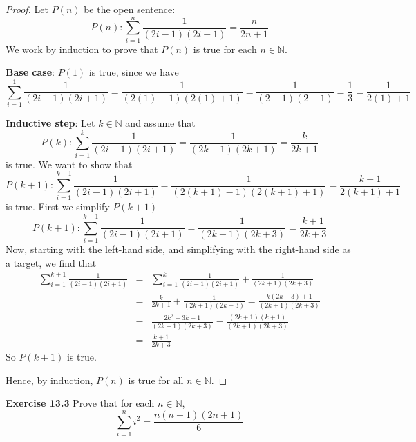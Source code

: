 \documentclass[12pt,oneside]{article}
\newenvironment{exercise}[1]{\vspace{.1in}\noindent\textbf{Exercise #1 \hspace{.05em}}}{}
\newcommand{\N}{\mathbb{N}}
\begin{document}
\begin{proof}
Let $P(n)$ be the open sentence:
\[P(n): \sum_{i=1}^{n} \frac{1}{(2i-1)(2i+1)} = \frac{n}{2n + 1}\]
We work by induction to prove that $P(n)$ is true for each $n \in \N$.

\textbf{Base case}: $P(1)$ is true, since we have
\[\sum_{i=1}^{1} \frac{1}{(2i-1)(2i+1)} = \frac{1}{(2(1)-1)(2(1)+1)} = \frac{1}{(2-1)(2+1)} = \frac{1}{3} = \frac{1}{2(1) + 1}\]

\textbf{Inductive step}: Let $k \in \N$ and assume that
\[P(k): \sum_{i=1}^{k} \frac{1}{(2i-1)(2i+1)} = \frac{1}{(2k-1)(2k+1)} = \frac{k}{2k + 1}\]
is true. We want to show that
\[P(k+1): \sum_{i=1}^{k+1} \frac{1}{(2i-1)(2i+1)} = \frac{1}{(2(k+1)-1)(2(k+1)+1)} = \frac{k+1}{2(k+1) + 1}\]
is true. First we simplify $P(k+1)$
\[P(k+1): \sum_{i=1}^{k+1} \frac{1}{(2i-1)(2i+1)} = \frac{1}{(2k+1)(2k+3)} = \frac{k+1}{2k+3}\]
Now, starting with the left-hand side, and simplifying with the right-hand side as a target, we find that
\begin{eqnarray*}
\sum_{i=1}^{k+1} \frac{1}{(2i-1)(2i+1)} &=& \sum_{i=1}^{k} \frac{1}{(2i-1)(2i+1)} + \frac{1}{(2k+1)(2k+3)} \\
&=& \frac{k}{2k + 1} + \frac{1}{(2k+1)(2k+3)} = \frac{k(2k+3) + 1}{{(2k+1)(2k+3)}} \\
&=& \frac{2k^2 + 3k + 1}{{(2k+1)(2k+3)}} = \frac{(2k+1)(k+1)}{{(2k+1)(2k+3)}} \\
&=& \frac{k+1}{2k+3}
\end{eqnarray*}
So $P(k + 1)$ is true.

Hence, by induction, $P(n)$ is true for all $n \in \N$.
\end{proof}



\begin{exercise}{13.3}
Prove that for each $n \in \N$,
\[\sum_{i=1}^{n} i^2 = \frac{n(n+1)(2n+1)}{6}\]
\end{exercise}
\end{document}
